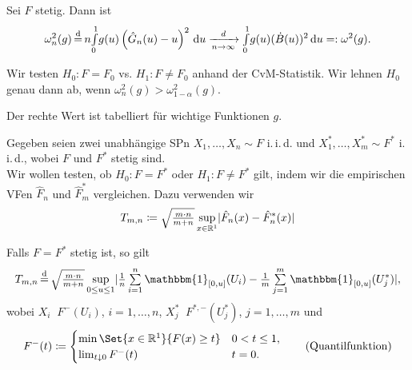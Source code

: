 \documentclass{cheat-sheet}
\newcommand{\ind}{\mathbbm{1}} %
\DeclareMathOperator*{\eqqd}{\stackrel{d}{=}} %
\newcommand{\iid}{i.\,i.\,d.} %
\begin{document}
\begin{satz}
  Sei $F$ stetig.
  Dann ist
  \[
    \omega_n^2(g) \eqqd n \Int{0}{1}{g(u) \left( \hat{G}_n(u) - u \right)^2}{u}
    \xra[n \to \infty]{d} \Int{0}{1}{g(u) (\dot{B}(u))^2}{u} =: \omega^2(g).
  \]
\end{satz}

\begin{entscheidungsregel}
  Wir testen $H_0 : F = F_0$ vs. $H_1 : F \neq F_0$ anhand der CvM-Statistik.
  Wir lehnen $H_0$ genau dann ab, wenn $\omega_n^2(g) > \omega_{1-\alpha}^2(g)$.
\end{entscheidungsregel}

\begin{bem}
  Der rechte Wert ist tabelliert für wichtige Funktionen $g$.
\end{bem}


\begin{situation}
  Gegeben seien zwei unabhängige SPn $X_1, \ldots, X_n \sim F$ \iid{} und $X_1^*, \ldots, X_m^* \sim F^*$ \iid{}, wobei $F$ und $F^*$ stetig sind. \\
  Wir wollen testen, ob $H_0 : F = F^*$ oder $H_1 : F \neq F^*$ gilt, indem wir die empirischen VFen $\hat{F}_n$ und $\hat{F}_m^*$ vergleichen.
  Dazu verwenden wir
  \[ T_{m,n} \coloneqq \sqrt{\tfrac{m \cdot n}{m + n}} \sup_{x \in \mathbb{R}^1} \lvert\hat{F}_n(x) - \hat{F}_n^*(x)\rvert \]
\end{situation}

\begin{satz}
  Falls $F = F^*$ stetig ist, so gilt
  \[ T_{m,n} \eqqd \sqrt{\tfrac{m \cdot n}{m + n}} \sup_{0 \leq u \leq 1} \abs{\tfrac{1}{n} \sum_{i=1}^n \ind_{\cinterval{0}{u}} (U_i) - \tfrac{1}{m} \sum_{j=1}^m \ind_{\cinterval{0}{u}} (U_j^*)}, \]
  wobei $X_i \eqqd F^{-}(U_i)$, $i = 1, \ldots, n$, \enspace
  $X_j^* \eqqd F^{*,-}(U_j^*)$, $j = 1, \ldots, m$ und
  \[
    F^{-}(t) \coloneqq \begin{cases}
      \min \Set{x \in \R^1}{F(x) \geq t} & 0 < t \leq 1, \\
      \lim_{t \downarrow 0} F^{-}(t) & t = 0.
    \end{cases}
    \tag{Quantilfunktion}
  \]
\end{satz}
\end{document}
